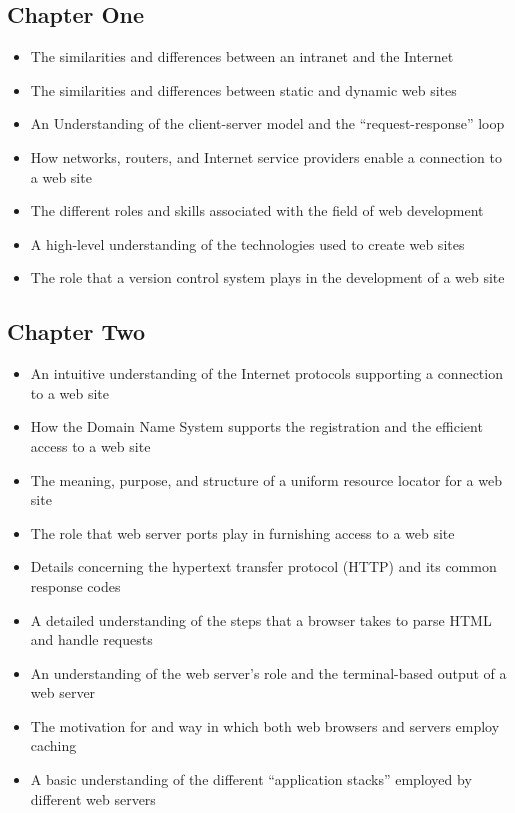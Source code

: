 \documentclass[11pt]{article}
\begin{document}
\vspace*{-.15in}

\subsection*{Chapter One}

\begin{itemize}

  \itemsep 0in

  \item The similarities and differences between an intranet and the Internet
  \item The similarities and differences between static and dynamic web sites
  \item An Understanding of the client-server model and the ``request-response''
    loop
  \item How networks, routers, and Internet service providers enable a
    connection to a web site
  \item The different roles and skills associated with the field of web development
  \item A high-level understanding of the technologies used to create web sites
  \item The role that a version control system plays in the development of a web
    site

\end{itemize}

\vspace*{-.2in}
\subsection*{Chapter Two}

\begin{itemize}

  \itemsep 0in

  \item An intuitive understanding of the Internet protocols supporting a
    connection to a web site
  \item How the Domain Name System supports the registration and the efficient
    access to a web site
  \item The meaning, purpose, and structure of a uniform resource locator for a
    web site
  \item The role that web server ports play in furnishing access to a web site
  \item Details concerning the hypertext transfer protocol (HTTP) and its
    common response codes
  \item A detailed understanding of the steps that a browser takes to parse HTML
    and handle requests
  \item An understanding of the web server's role and the terminal-based output
    of a web server
  \item The motivation for and way in which both web browsers and servers employ
    caching
  \item A basic understanding of the different ``application stacks'' employed
    by different web servers

\end{itemize}
\end{document}
